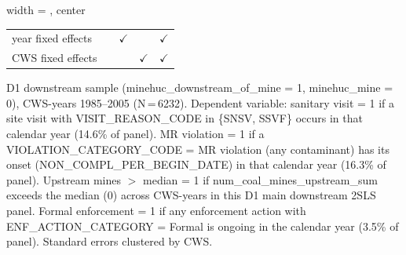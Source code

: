 \begin{table}[htbp]
\begin{adjustbox}{width = \textwidth, center}
\begin{tabular}{lcccc}
          \\
         
         year fixed effects        &                & $\checkmark$  &                & $\checkmark$\\   
         CWS fixed effects         &                &               & $\checkmark$   & $\checkmark$\\   
         
         \bottomrule
         
      \end{tabular}
      
      
      
   \end{adjustbox}
      {\tiny\linespread{1}\selectfont \par \raggedright 
   D1 downstream sample (minehuc\_downstream\_of\_mine = 1, minehuc\_mine = 0), CWS-years 1985--2005 (N\,=\,6232). Dependent variable: sanitary visit = 1 if a site visit with VISIT\_REASON\_CODE in \{SNSV, SSVF\} occurs in that calendar year (14.6\% of panel). MR violation = 1 if a VIOLATION\_CATEGORY\_CODE = MR violation (any contaminant) has its onset (NON\_COMPL\_PER\_BEGIN\_DATE) in that calendar year (16.3\% of panel). Upstream mines $>$ median = 1 if num\_coal\_mines\_upstream\_sum exceeds the median (0) across CWS-years in this D1 main downstream 2SLS panel. Formal enforcement = 1 if any enforcement action with ENF\_ACTION\_CATEGORY = Formal is ongoing in the calendar year (3.5\% of panel). Standard errors clustered by CWS.}
   
\end{table}


